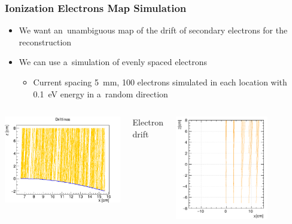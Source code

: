 \documentclass{beamer}
\begin{document}
	\begin{frame}
		\frametitle{Ionization Electrons Map Simulation}
		\begin{itemize}
			\item We want an~unambiguous map of the drift of secondary electrons for the reconstruction
			\item We can use a~simulation of evenly spaced electrons
			\begin{itemize}
				\item Current spacing 5~mm, 100 electrons simulated in each location with 0.1~eV energy in a~random direction
			\end{itemize}
		\end{itemize}
		\begin{columns}
				\centering
				\begin{minipage}[t][4.2cm]{\textwidth}
					\centering
					\includegraphics[width = \textwidth]{../images/drift_xz.png}\\
				\end{minipage}
				{Electron drift}
				\centering
				\begin{minipage}[t][4.2cm]{\textwidth}
					\centering
					\includegraphics[width=0.7\textwidth]{../images/map_lines_flipped.png}\\

\end{minipage}
\end{columns}
\end{frame}
\end{document}
